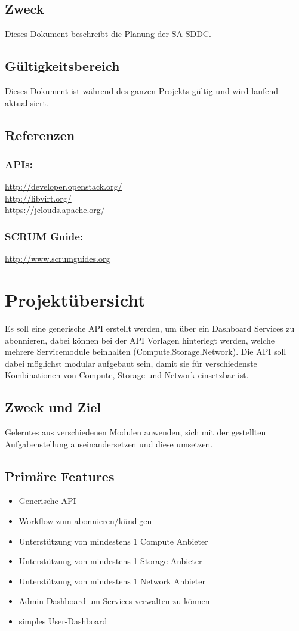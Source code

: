 \documentclass[11pt]{scrartcl}
\begin{document}
\subsection{Zweck}
Dieses Dokument beschreibt die Planung der SA SDDC.
\subsection{Gültigkeitsbereich}
Dieses Dokument ist während des ganzen Projekts gültig und wird laufend aktualisiert.

\subsection{Referenzen}
\subsubsection{APIs:} \href{http://developer.openstack.org/}{http://developer.openstack.org/} 
\\
\href{http://libvirt.org/}{http://libvirt.org/} \\
\href{https://jclouds.apache.org/}{https://jclouds.apache.org/}
\subsubsection{SCRUM Guide:} 
\href{http://www.scrumguides.org/docs/scrumguide/v1/Scrum-Guide-DE.pdf}{http://www.scrumguides.org}
\section{Projektübersicht}
Es soll eine generische API erstellt werden, um über ein 
Dashboard Services zu abonnieren, dabei können bei der API Vorlagen 
hinterlegt werden, welche mehrere Servicemodule beinhalten 
(Compute,Storage,Network).
Die API soll dabei möglichst modular aufgebaut sein, damit sie für verschiedenste
Kombinationen von Compute, Storage und Network einsetzbar ist.
\subsection{Zweck und Ziel}
 Gelerntes aus verschiedenen Modulen anwenden, sich mit der gestellten 
 Aufgabenstellung auseinandersetzen 
 und diese umsetzen.

\subsection{Primäre Features}
\begin{itemize}
  \item Generische API
  \item Workflow zum abonnieren/kündigen
  \item Unterstützung von mindestens 1 Compute Anbieter
  \item Unterstützung von mindestens 1 Storage Anbieter
  \item Unterstützung von mindestens 1 Network Anbieter
  \item Admin Dashboard um Services verwalten zu können
  \item simples User-Dashboard
\end{itemize}
\end{document}
